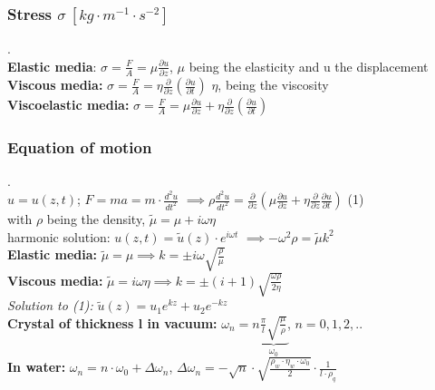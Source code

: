 \documentclass[9pt]{article}
\begin{document}
\begin{multicols}{2}
\subsubsection{Stress $\sigma \ [kg\cdot m^{-1}\cdot s^{-2}]$}
.\\
\textbf{Elastic media}: $\sigma =\frac{F}{A}= \mu \frac{\partial u}{\partial z}$, $\mu$ being the elasticity and u the displacement\\
\textbf{Viscous media:}	$\sigma =\frac{F}{A}= \eta \frac{\partial}{\partial z}(\frac{\partial u}{\partial t})$ $\eta$, being the viscosity\\
\textbf{Viscoelastic media:} $\sigma =\frac{F}{A}= \mu \frac{\partial u}{\partial z}+\eta \frac{\partial}{\partial z}(\frac{\partial u}{\partial t})$
\subsubsection{Equation of motion}
.\\
$u=u(z,t)$; $F=ma=m\cdot \frac{d^2u}{dt^2}$
$\implies \rho \frac{d^2u}{dt^2}= \frac{\partial}{\partial z}(\mu \frac{\partial u}{\partial z}+\eta \frac{\partial}{\partial z}\frac{\partial u}{\partial t})$ (1)\\ with $\rho$ being the density, $\tilde \mu=\mu +i \omega \eta $\\
harmonic solution: $u(z,t)=\tilde u (z)\cdot  e^{i \omega t}$ $\implies -\omega ^2 \rho = \tilde \mu k^2$\\
\textbf{Elastic media:} $\tilde \mu= \mu \implies k=\pm i\omega \sqrt{\frac{\rho}{\mu}}$\\
\textbf{Viscous media:} $\tilde \mu= i\omega \eta \implies k=\pm (i+1) \sqrt{\frac{\omega \rho}{2 \eta}}$\\
\emph{Solution to (1):} $\tilde u (z)=u_1 e^{kz}+u_2 e^{-kz}$\\
\textbf{Crystal of thickness l in vacuum:} $\omega _n=n \underbrace{\frac{\pi}{l}\sqrt{\frac{\mu}{\rho}}}_{\omega _0}$, $n=0,1,2,..$\\
\textbf{In water:} $\omega _n =n\cdot \omega _0+\Delta \omega _n$, $\Delta \omega _n = -\sqrt{n}\cdot \sqrt{\frac{\rho _w \cdot \eta _w \cdot \omega _0}{2}}\cdot \frac{1}{l\cdot \rho _q}$

\end{multicols}
\end{document}
